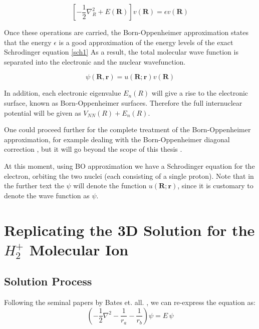 \begin{equation}\label{v}
\left[ -\frac{1}{2}\nabla_R^2 + E(\mathbf{R}) \right] v( \mathbf{R} ) = \epsilon  v( \mathbf{R} )
\end{equation}

Once these operations are carried, the Born-Oppenheimer approximation states that the energy $ \epsilon $ is a good approximation of the energy levels of the exact Schrodinger equation \eqref{sch1}
 As a result, the total molecular wave function is separated into the electronic and the nuclear wavefunction.

\begin{equation}
\psi(\mathbf{R},\mathbf{r}) =  u(\mathbf{R};\mathbf{r})  v( \mathbf{R} )
\end{equation}

In addition, each electronic eigenvalue $ E_n(R) $ will give a rise to the electronic surface, known as Born-Oppenheimer surfaces. Therefore the full internuclear potential will be given as $ V_{NN}(R) + E_n(R) $. 

One could proceed further for the complete treatment of the Born-Oppenheimer approximation, for example dealing with the Born-Oppenheimer diagonal correction \cite{BOApprox2}, but it will go beyond the scope of this thesis . 

At this moment, using BO approximation we have a Schrodinger equation for the electron, orbiting the two nuclei (each consisting of a single proton). Note that in the further text the $ \psi $ will denote the function $  u(\mathbf{R}; \mathbf{r} ) $, since it is customary to denote the wave function as $ \psi $. 

\section{Replicating the 3D Solution for the \texorpdfstring{$ H_2^{+} $}{ $H_2^+ $ } Molecular Ion }

\subsection{Solution Process}

Following the seminal papers by Bates et. all.  \cite{Bates1}\cite{Bates2}, we can re-express the equation  as:
\begin{equation}\label{eqPartial3D}
\left(-\frac{1}{2}\nabla^2-\frac{1}{r_a}-\frac{1}{r_b}\right)\psi = E\,\psi
\end{equation}

